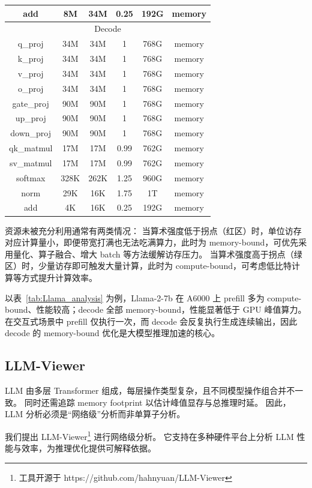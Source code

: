 \begin{table}[tb]
{\begin{tabular}{@{}cccccc@{}}
add        & 8M   & 34M  & 0.25 & 192G & memory  \\ \midrule
\multicolumn{6}{c}{Decode} \\ \midrule
q\_proj    & 34M  & 34M  & 1    & 768G & memory  \\
k\_proj    & 34M  & 34M  & 1    & 768G & memory  \\
v\_proj    & 34M  & 34M  & 1    & 768G & memory  \\
o\_proj    & 34M  & 34M  & 1    & 768G & memory  \\
gate\_proj & 90M  & 90M  & 1    & 768G & memory  \\
up\_proj   & 90M  & 90M  & 1    & 768G & memory  \\
down\_proj & 90M  & 90M  & 1    & 768G & memory  \\
qk\_matmul & 17M  & 17M  & 0.99 & 762G & memory  \\
sv\_matmul & 17M  & 17M  & 0.99 & 762G & memory  \\
softmax    & 328K & 262K & 1.25 & 960G & memory  \\
norm       & 29K  & 16K  & 1.75 & 1T   & memory  \\
add        & 4K   & 16K  & 0.25 & 192G & memory  \\ \bottomrule
\end{tabular}
}
\end{table}

资源未被充分利用通常有两类情况：
当算术强度低于拐点（红区）时，单位访存对应计算量小，即便带宽打满也无法吃满算力，此时为 memory-bound，可优先采用量化、算子融合、增大 batch 等方法缓解访存压力。
当算术强度高于拐点（绿区）时，少量访存即可触发大量计算，此时为 compute-bound，可考虑低比特计算等方式提升计算效率。

以表~\ref{tab:Llama_analysis} 为例，Llama-2-7b 在 A6000 上 prefill 多为 compute-bound、性能较高；decode 全部 memory-bound，性能显著低于 GPU 峰值算力。
在交互式场景中 prefill 仅执行一次，而 decode 会反复执行生成连续输出，因此 decode 的 memory-bound 优化是大模型推理加速的核心。

\subsection{LLM-Viewer}
\label{sec:llmviewer}

LLM 由多层 Transformer 组成，每层操作类型复杂，且不同模型操作组合并不一致。
同时还需追踪 memory footprint 以估计峰值显存与总推理时延。
因此，LLM 分析必须是“网络级”分析而非单算子分析。

我们提出 LLM-Viewer\footnote{工具开源于 https://github.com/hahnyuan/LLM-Viewer} 进行网络级分析。
它支持在多种硬件平台上分析 LLM 性能与效率，为推理优化提供可解释依据。

